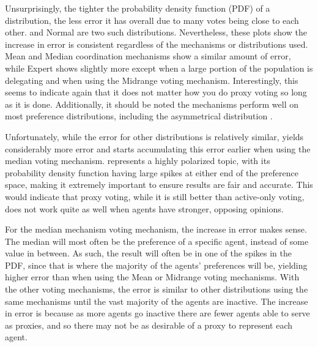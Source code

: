 Unsurprisingly, the tighter the probability density function (PDF) of a distribution,
the less error it has overall due to many votes being close to each other.
 and Normal are two such distributions.
Nevertheless, these plots show the increase in error is consistent regardless of the
mechanisms or distributions used.
Mean and Median coordination mechanisms show a similar amount of error, while Expert
shows slightly more except when a large portion of the population is delegating and
when using the Midrange voting mechanism.
Interestingly, this seems to indicate again that it does not matter how you do proxy
voting so long as it is done.
Additionally, it should be noted the mechanisms perform well on most preference
distributions, including the asymmetrical distribution .

Unfortunately, while the error for other distributions is relatively similar,
 yields considerably more error and starts accumulating
this error earlier when using the median voting mechanism.
 represents a highly polarized topic, with its probability
density function having large spikes at either end of the preference space, making it
extremely important to ensure results are fair and accurate.
This would indicate that proxy voting, while it is still better than active-only
voting, does not work quite as well when agents have stronger, opposing opinions.

For the median mechanism voting mechanism, the increase in error makes sense.
The median will most often be the preference of a specific agent, instead of some
value in between.
As such, the result will often be in one of the spikes in the PDF, since that is
where the majority of the agents' preferences will be, yielding higher error than when
using the Mean or Midrange voting mechanisms.
With the other voting mechanisms, the error is similar to other distributions using
the same mechanisms until the vast majority of the agents are inactive.
The increase in error is because as more agents go inactive there are fewer agents able
to serve as proxies, and so there may not be as desirable of a proxy to represent
each agent.

